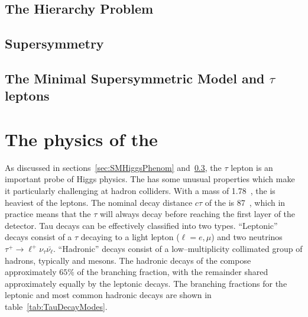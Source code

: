 \subsection{The Hierarchy Problem}
\subsection{Supersymmetry}
\subsection{The Minimal Supersymmetric Model and $\tau$ leptons}
\label{sec:MSSMAndTaus}

\section{The physics of the \taul}
As discussed in sections~\ref{sec:SMHiggsPhenom} and~\ref{sec:MSSMAndTaus}, the
$\tau$ lepton is an important probe of Higgs physics.  The \taul has some
unusual properties which make it particularly challenging at hadron colliders.
With a mass of 1.78~\GeVcc, the \taul is heaviest of the leptons.  The nominal
decay distance $c\tau$ of the \taul is 87~\micron, which in practice means that
the $\tau$ will always decay before reaching the first layer of the detector.
Tau decays can be effectively classified into two types. ``Leptonic'' decays
consist of a $\tau$ decaying to a light lepton ($\ell = e, \mu$) and two
neutrinos $\tau^+ \to \ell^+ \nu_\tau \bar{ \nu_{\ell}}$.  ``Hadronic'' decays 
consist of a low--multiplicity collimated group of hadrons, typically \Pgppm and \Pgpz
mesons.  The hadronic decays of the \taul compose approximately $65\%$ of the
\taul branching fraction, with the remainder shared approximately equally by the
leptonic decays.  The branching fractions for the leptonic and most common hadronic decays
are shown in table~\ref{tab:TauDecayModes}.
